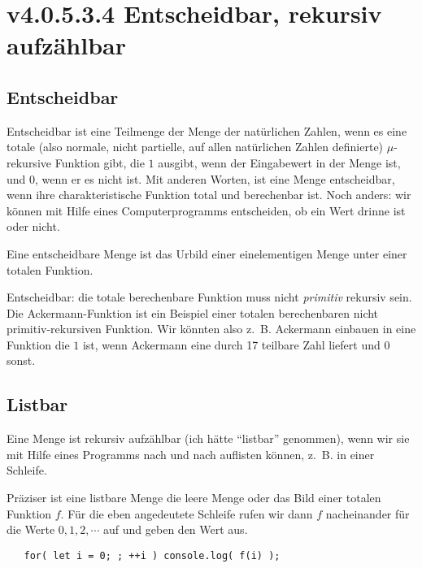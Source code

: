 \documentclass[a4paper]{amsart}
\theoremstyle{definition}
\newcommand{\zb}{z.~B. }
\begin{document}
\section{v4.0.5.3.4 Entscheidbar, rekursiv aufzählbar}

\subsection{Entscheidbar}
Entscheidbar ist eine Teilmenge der Menge der natürlichen Zahlen, wenn es eine totale (also normale, nicht partielle, auf allen natürlichen Zahlen definierte) $\mu$-rekursive Funktion gibt, die $1$ ausgibt, wenn der Eingabewert in der Menge ist, und $0$, wenn er es nicht ist. Mit anderen Worten, ist eine Menge entscheidbar, wenn ihre charakteristische Funktion total und berechenbar ist. Noch anders: wir können mit Hilfe eines Computerprogramms entscheiden, ob ein Wert drinne ist oder nicht.

Eine entscheidbare Menge ist das Urbild einer einelementigen Menge unter einer totalen Funktion.

Entscheidbar: die totale berechenbare Funktion muss nicht \emph{primitiv} rekursiv sein. Die Ackermann-Funktion ist ein Beispiel einer totalen berechenbaren nicht primitiv-rekursiven Funktion. Wir könnten also \zb Ackermann einbauen in eine Funktion die $1$ ist, wenn Ackermann eine durch 17 teilbare Zahl liefert und $0$ sonst.

\subsection{Listbar}
Eine Menge ist rekursiv aufzählbar (ich hätte "`listbar"' genommen), wenn wir sie mit Hilfe eines Programms nach und nach auflisten können, \zb in einer Schleife.

Präziser ist eine listbare Menge die leere Menge oder das Bild einer totalen Funktion $f$. Für die eben angedeutete Schleife rufen wir dann $f$ nacheinander für die Werte $0, 1, 2, \cdots $ auf und geben den Wert aus.
\begin{lstlisting}
   for( let i = 0; ; ++i ) console.log( f(i) );
\end{lstlisting}
\end{document}
